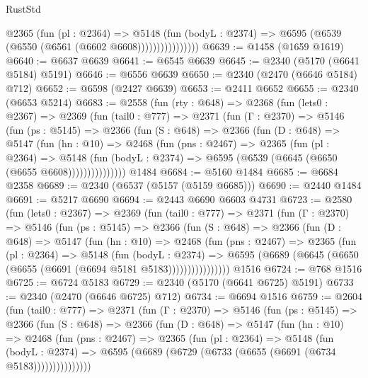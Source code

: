 \begin{lexlean}{RustStd}
\begin{coremodule}
                      @2365
                        (fun (pl : @2364) =>
                        @5148
                          (fun (bodyL : @2374) =>
                          @6595 (@6539 (@6550 (@6561 (@6602 @6608))))))))))))))))
@6639 := @1458 (@1659 @1619)
@6640 := @6637 @6639
@6641 := @6545 @6639
@6645 := @2340 (@5170 (@6641 @5184) @5191)
@6646 := @6556 @6639
@6650 := @2340 (@2470 (@6646 @5184) @712)
@6652 := @6598 (@2427 @6639)
@6653 := @2411 @6652
@6655 := @2340 (@6653 @5214)
@6683 := @2558
    (fun (rty : @648) =>
    @2368
      (fun (lets0 : @2367) =>
      @2369
        (fun (tail0 : @777) =>
        @2371
          (fun (Γ : @2370) =>
          @5146
            (fun (ps : @5145) =>
            @2366
              (fun (S : @648) =>
              @2366
                (fun (D : @648) =>
                @5147
                  (fun (hn : @10) =>
                  @2468
                    (fun (pns : @2467) =>
                    @2365
                      (fun (pl : @2364) =>
                      @5148
                        (fun (bodyL : @2374) =>
                        @6595 (@6539 (@6645 (@6650 (@6655 @6608)))))))))))))))
    @1484
@6684 := @5160 @1484
@6685 := @6684 @2358
@6689 := @2340 (@6537 (@5157 (@5159 @6685)))
@6690 := @2440 @1484
@6691 := @5217 @6690
@6694 := @2443 @6690 @6603 @4731
@6723 := @2580
    (fun (lets0 : @2367) =>
    @2369
      (fun (tail0 : @777) =>
      @2371
        (fun (Γ : @2370) =>
        @5146
          (fun (ps : @5145) =>
          @2366
            (fun (S : @648) =>
            @2366
              (fun (D : @648) =>
              @5147
                (fun (hn : @10) =>
                @2468
                  (fun (pns : @2467) =>
                  @2365
                    (fun (pl : @2364) =>
                    @5148
                      (fun (bodyL : @2374) =>
                      @6595 (@6689 (@6645 (@6650 (@6655 (@6691 (@6694 @5181 @5183))))))))))))))))
    @1516
@6724 := @768 @1516
@6725 := @6724 @5183
@6729 := @2340 (@5170 (@6641 @6725) @5191)
@6733 := @2340 (@2470 (@6646 @6725) @712)
@6734 := @6694 @1516
@6759 := @2604
    (fun (tail0 : @777) =>
    @2371
      (fun (Γ : @2370) =>
      @5146
        (fun (ps : @5145) =>
        @2366
          (fun (S : @648) =>
          @2366
            (fun (D : @648) =>
            @5147
              (fun (hn : @10) =>
              @2468
                (fun (pns : @2467) =>
                @2365
                  (fun (pl : @2364) =>
                  @5148
                    (fun (bodyL : @2374) =>
                    @6595 (@6689 (@6729 (@6733 (@6655 (@6691 (@6734 @5183)))))))))))))))

\end{coremodule}
\end{lexlean}
